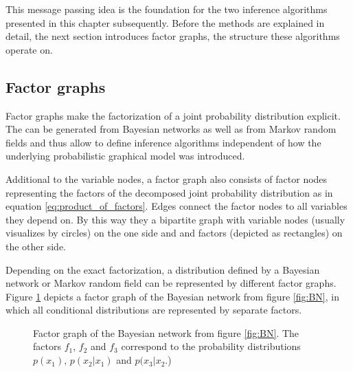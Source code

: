 \documentclass{sigkdd}
\begin{document}
This message passing idea is the foundation for the two inference algorithms presented in this chapter subsequently. Before the methods are explained in detail, the next section introduces factor graphs, the structure these algorithms operate on.

\subsection{Factor graphs}
Factor graphs make the factorization of a joint probability distribution explicit. The can be generated from Bayesian networks as well as from Markov random fields and thus allow to define inference algorithms independent of how the underlying probabilistic graphical model was introduced.

Additional to the variable nodes, a factor graph also consists of factor nodes representing the factors of the decomposed joint probability distribution as in equation  \ref{eq:product_of_factors}. Edges connect the factor nodes to all variables they depend on. By this way they a bipartite graph with variable nodes (usually visualizes by circles) on the one side and and factors (depicted as rectangles) on the other side.

Depending on the exact factorization, a distribution defined by a Bayesian network or Markov random field can be represented by different factor graphs. Figure \ref{fig:FG} depicts a factor graph of the Bayesian network from figure \ref{fig:BN}, in which all conditional distributions are represented by separate factors.

\begin{figure}[h]
	\centering
	\caption{Factor graph of the Bayesian network from figure \ref{fig:BN}. The factors $f_1$, $f_2$ and $f_3$ correspond to the probability distributions $p(x_1)$, $p(x_2|x_1)$ and $p(x_3|x_2$.)}\label{fig:FG}
\end{figure}
\end{document}
